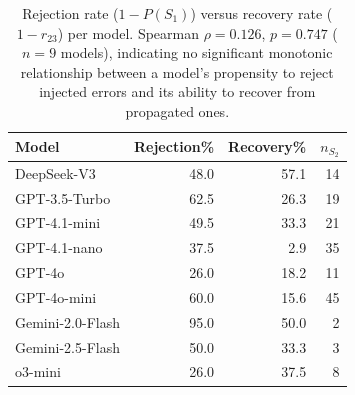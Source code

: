 \begin{table}[t]
\centering
\caption{Rejection rate ($1 - P(S_1)$) versus recovery rate ($1 - r_{23}$) per model. Spearman $\rho = 0.126$, $p = 0.747$ ($n = 9$ models), indicating no significant monotonic relationship between a model's propensity to reject injected errors and its ability to recover from propagated ones.}
\label{tab:rejection_recovery}
\begin{tabular}{l r r r}
\toprule
Model & Rejection\% & Recovery\% & $n_{S_2}$ \\
\midrule
DeepSeek-V3 & 48.0 & 57.1 & 14 \\
GPT-3.5-Turbo & 62.5 & 26.3 & 19 \\
GPT-4.1-mini & 49.5 & 33.3 & 21 \\
GPT-4.1-nano & 37.5 & 2.9 & 35 \\
GPT-4o & 26.0 & 18.2 & 11 \\
GPT-4o-mini & 60.0 & 15.6 & 45 \\
Gemini-2.0-Flash & 95.0 & 50.0 & 2 \\
Gemini-2.5-Flash & 50.0 & 33.3 & 3 \\
o3-mini & 26.0 & 37.5 & 8 \\
\bottomrule
\end{tabular}
\end{table}